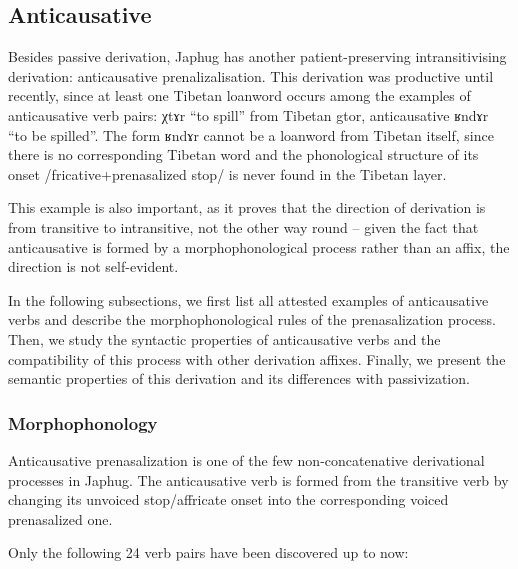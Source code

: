 \documentclass[oldfontcommands,oneside,a4paper,11pt]{memoir}
\newcommand{\ipa}[1]{{\phon #1}} %
\begin{document}
\subsection{Anticausative} \label{sub:anticausative}
Besides passive derivation, Japhug has another patient-preserving intransitivising derivation: anticausative prenalizalisation. This derivation was productive until recently, since at least one Tibetan loanword occurs among the examples of anticausative verb pairs: \ipa{χtɤr} ``to spill'' from Tibetan \ipa{gtor}, anticausative \ipa{ʁndɤr} ``to be spilled''.  The form \ipa{ʁndɤr} cannot be a loanword from Tibetan itself, since there is no corresponding Tibetan word and the phonological structure of its onset /fricative+prenasalized stop/ is never found in the Tibetan layer.

This example is also important, as it proves that the direction of derivation is from transitive to intransitive, not the other way round -- given the fact that anticausative is formed by a morphophonological process rather than an affix, the direction is not self-evident.

In the following subsections, we first list all attested examples of anticausative verbs and describe the morphophonological rules of the prenasalization process. Then, we study the syntactic properties of anticausative verbs and the compatibility of this process with other derivation affixes. Finally, we present the semantic properties of this derivation and its differences with passivization.

\subsubsection{Morphophonology} \label{subsub:anticaus.morph}
Anticausative prenasalization is one of the few non-concatenative derivational processes in Japhug. The anticausative verb is formed from the transitive verb by changing its unvoiced stop/affricate onset into the corresponding voiced prenasalized one. 





Only the following 24 verb pairs have been discovered up to now:
\end{document}
